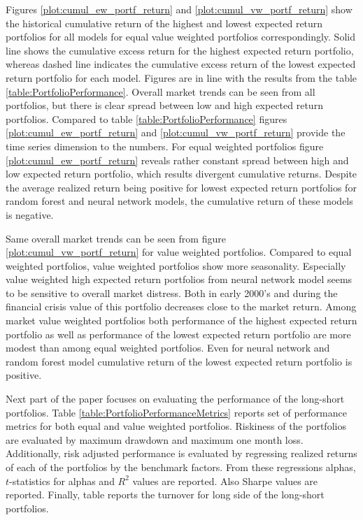 \documentclass{article}
\begin{document}
Figures \ref{plot:cumul_ew_portf_return} and \ref{plot:cumul_vw_portf_return} show the historical cumulative return of the highest and lowest expected return portfolios for all models for equal value weighted portfolios correspondingly. Solid line shows the cumulative excess return for the highest expected return portfolio, whereas dashed line indicates the cumulative excess return of the lowest expected return portfolio for each model. Figures are in line with the results from the table \ref{table:PortfolioPerformance}. Overall market trends can be seen from all portfolios, but there is clear spread between low and high expected return portfolios. Compared to table \ref{table:PortfolioPerformance} figures \ref{plot:cumul_ew_portf_return} and \ref{plot:cumul_vw_portf_return} provide the time series dimension to the numbers. For equal weighted portfolios figure \ref{plot:cumul_ew_portf_return} reveals rather constant spread between high and low expected return portfolio, which results divergent cumulative returns. Despite the average realized return being positive for lowest expected return portfolios for random forest and neural network models, the cumulative return of these models is negative. \par

Same overall market trends can be seen from figure \ref{plot:cumul_vw_portf_return} for value weighted portfolios. Compared to equal weighted portfolios, value weighted portfolios show more seasonality. Especially value weighted high expected return portfolios from neural network model seems to be sensitive to overall market distress. Both in early 2000's and during the financial crisis value of this portfolio decreases close to the market return. Among market value weighted portfolios both performance of the highest expected return portfolio as well as performance of the lowest expected return portfolio are more modest than among equal weighted portfolios. Even for neural network and random forest model cumulative return of the lowest expected return portfolio is positive. \par

Next part of the paper focuses on evaluating the performance of the long-short portfolios. Table \ref{table:PortfolioPerformanceMetrics} reports set of performance metrics for both equal and value weighted portfolios. Riskiness of the portfolios are evaluated by maximum drawdown and maximum one month loss. Additionally, risk adjusted performance is evaluated by regressing realized returns of each of the portfolios by the benchmark factors. From these regressions alphas, $t$-statistics for alphas and $R^2$ values are reported. Also Sharpe values are reported. Finally, table reports the turnover for long side of the long-short portfolios. \par
\end{document}
